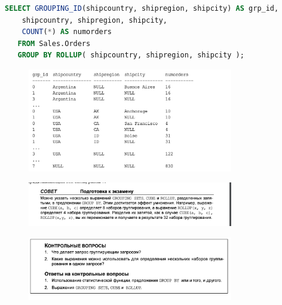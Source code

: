 \begin{lstlisting}[label=lst:funcReturn, language=sql]
	SELECT GROUPING_ID(shipcountry, shipregion, shipcity) AS grp_id,
	shipcountry, shipregion, shipcity,
	COUNT(*) AS numorders
   FROM Sales.Orders
   GROUP BY ROLLUP( shipcountry, shipregion, shipcity ); 
\end{lstlisting}	



\begin{figure}[h!]
	\begin{center}
		\includegraphics[width=0.8\textwidth]{img/res14.png}
	\end{center}
	\captionsetup{justification=centering}
\end{figure}	


\begin{figure}[h!]
	\begin{center}
		\includegraphics[width=0.8\textwidth]{img/advice9.png}
	\end{center}
	\captionsetup{justification=centering}
\end{figure}	


\begin{figure}[h!]
	\begin{center}
		\includegraphics[width=0.8\textwidth]{img/control14.png}
	\end{center}
	\captionsetup{justification=centering}
\end{figure}	


